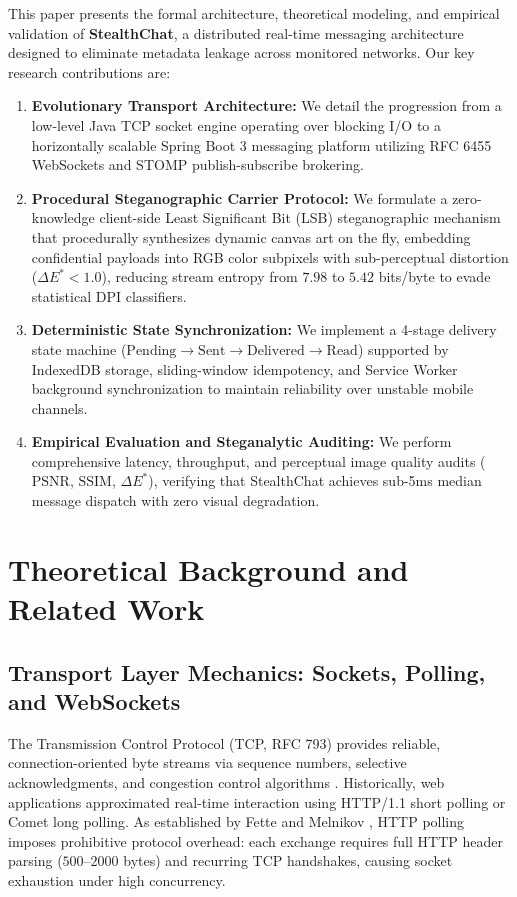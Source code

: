 \documentclass[conference]{IEEEtran}
\begin{document}
This paper presents the formal architecture, theoretical modeling, and empirical validation of \textbf{StealthChat}, a distributed real-time messaging architecture designed to eliminate metadata leakage across monitored networks. Our key research contributions are:
\begin{enumerate}
    \item \textbf{Evolutionary Transport Architecture:} We detail the progression from a low-level Java TCP socket engine operating over blocking I/O to a horizontally scalable Spring Boot 3 messaging platform utilizing RFC 6455 WebSockets and STOMP publish-subscribe brokering.
    \item \textbf{Procedural Steganographic Carrier Protocol:} We formulate a zero-knowledge client-side Least Significant Bit (LSB) steganographic mechanism that procedurally synthesizes dynamic canvas art on the fly, embedding confidential payloads into RGB color subpixels with sub-perceptual distortion ($\Delta E^* < 1.0$), reducing stream entropy from $7.98$ to $5.42$ bits/byte to evade statistical DPI classifiers.
    \item \textbf{Deterministic State Synchronization:} We implement a 4-stage delivery state machine ($\text{Pending} \to \text{Sent} \to \text{Delivered} \to \text{Read}$) supported by IndexedDB storage, sliding-window idempotency, and Service Worker background synchronization to maintain reliability over unstable mobile channels.
    \item \textbf{Empirical Evaluation and Steganalytic Auditing:} We perform comprehensive latency, throughput, and perceptual image quality audits ($\text{PSNR}$, $\text{SSIM}$, $\Delta E^*$), verifying that StealthChat achieves sub-5ms median message dispatch with zero visual degradation.
\end{enumerate}

\section{Theoretical Background and Related Work}

\subsection{Transport Layer Mechanics: Sockets, Polling, and WebSockets}
The Transmission Control Protocol (TCP, RFC 793) provides reliable, connection-oriented byte streams via sequence numbers, selective acknowledgments, and congestion control algorithms \cite{postel1981tcp}. Historically, web applications approximated real-time interaction using HTTP/1.1 short polling or Comet long polling. As established by Fette and Melnikov \cite{fette2011websocket}, HTTP polling imposes prohibitive protocol overhead: each exchange requires full HTTP header parsing ($500\text{--}2000$ bytes) and recurring TCP handshakes, causing socket exhaustion under high concurrency.
\end{document}
